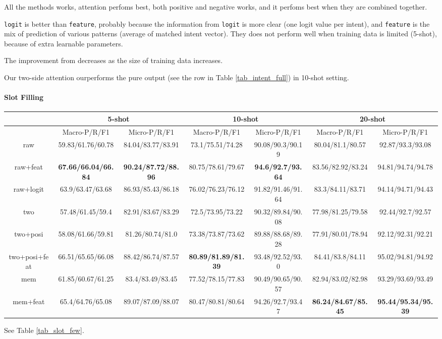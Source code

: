 All the methods works, attention perfoms best, both positive and negative works, and it perfoms best when they are combined together.

\texttt{logit} is better than \texttt{feature}, probably because the information from \texttt{logit} is more clear (one logit value per intent), and \texttt{feature} is the mix of prediction of various patterns (average of matched intent vector). They does not perform well when training data is limited (5-shot), because of extra learnable parameters.

The improvement from \RE decreases as the size of training data increases.

Our two-side attention ourperforms the pure \RE output (see the \RE row in Table \ref{tab_intent_full}) in 10-shot setting. 


\paragraph{Slot Filling}

\begin{table*}
\setlength{\tabcolsep}{0.23em}
\centering
\small{
\begin{tabular}{|c|c|c|c|c|c|c|}

\hline
  & \multicolumn{2}{|c|}{5-shot} & \multicolumn{2}{|c|}{10-shot} & \multicolumn{2}{|c|}{20-shot}  \\
 \hline
  & Macro-P/R/F1 & Micro-P/R/F1 & Macro-P/R/F1 & Micro-P/R/F1  & Macro-P/R/F1 & Micro-P/R/F1   \\
\hline
raw & 59.83/61.76/60.78 & 84.04/83.77/83.91 & 73.1/75.51/74.28  & 90.08/90.3/90.19 & 80.04/81.1/80.57 & 92.87/93.3/93.08 \\
\hline
raw+feat & \textbf{67.66/66.04/66.84} & \textbf{90.24/87.72/88.96} & 80.75/78.61/79.67 & \textbf{94.6/92.7/93.64} & 83.56/82.92/83.24 & 94.81/94.74/94.78 \\
\hline
raw+logit & 63.9/63.47/63.68 & 86.93/85.43/86.18 & 76.02/76.23/76.12 & 91.82/91.46/91.64  & 83.3/84.11/83.71 & 94.14/94.71/94.43 \\
\hline
two & 57.48/61.45/59.4 & 82.91/83.67/83.29 & 72.5/73.95/73.22 & 90.32/89.84/90.08 & 77.98/81.25/79.58 & 92.44/92.7/92.57 \\
\hline
two+posi & 58.08/61.66/59.81 & 81.26/80.74/81.0 & 73.38/73.87/73.62 & 89.88/88.68/89.28 & 77.91/80.01/78.94 & 92.12/92.31/92.21 \\
\hline
two+posi+feat & 66.51/65.65/66.08 & 88.42/86.74/87.57 & \textbf{80.89/81.89/81.39} & 93.48/92.52/93.0 & 84.41/83.8/84.11 & 95.02/94.81/94.92\\
\hline
mem & 61.85/60.67/61.25 & 83.4/83.49/83.45 & 77.52/78.15/77.83  & 90.49/90.65/90.57 & 82.94/83.02/82.98 & 93.29/93.69/93.49 \\
\hline
mem+feat & 65.4/64.76/65.08 & 89.07/87.09/88.07 & 80.47/80.81/80.64 & 94.26/92.7/93.47 & \textbf{86.24/84.67/85.45} & \textbf{95.44/95.34/95.39} \\
\hline
\end{tabular}
}
\caption{Slot Filling Result on Few-Shot Data}
\label{tab_slot_few}
\end{table*}
See Table \ref{tab_slot_few}.

